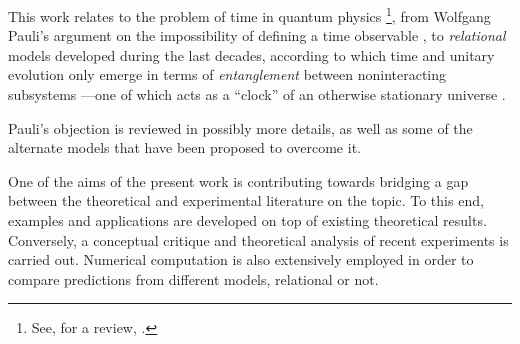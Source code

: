 This work relates to the problem of time in quantum physics%
\footnote{
  See, for a review, \cite{TQM1, TQM2}.
},
from Wolfgang Pauli's argument
on the impossibility of defining a time observable \parencite{PauliFootnote},
to \emph{relational} models
developed during the last decades,
according to which
time and unitary evolution only emerge in
terms of \emph{entanglement} between noninteracting subsystems
---one of which acts as a ``clock''
of an otherwise stationary universe \parencite{PageWootters, Marletto:Evolution}.

Pauli's objection is reviewed in possibly more details,
as well as some of the alternate models
that have been proposed
to overcome it.

One of the aims of the present work
is contributing towards bridging a gap between the theoretical
and experimental literature on the topic.
To this end, examples and applications are developed on top of existing theoretical results.
Conversely,
a conceptual critique and theoretical analysis
of recent experiments is carried out.
Numerical computation is also extensively employed in order to compare
predictions from different models, relational or not.